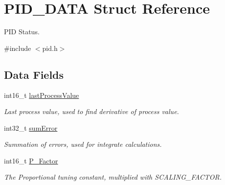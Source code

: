 \hypertarget{struct_p_i_d___d_a_t_a}{}\section{P\+I\+D\+\_\+\+D\+A\+TA Struct Reference}
\label{struct_p_i_d___d_a_t_a}


P\+ID Status.  




{\ttfamily \#include $<$pid.\+h$>$}

\subsection*{Data Fields}
\begin{DoxyCompactItemize}
\item 
\mbox{\label{struct_p_i_d___d_a_t_a_a824a2012e383ca3548dfc0969ce78af0}} 
int16\+\_\+t \hyperlink{struct_p_i_d___d_a_t_a_a824a2012e383ca3548dfc0969ce78af0}{last\+Process\+Value}
\begin{DoxyCompactList}\small\item\em Last process value, used to find derivative of process value. \end{DoxyCompactList}\item 
\mbox{\label{struct_p_i_d___d_a_t_a_abb4705ed19c8668cc3b2a290bcad221d}} 
int32\+\_\+t \hyperlink{struct_p_i_d___d_a_t_a_abb4705ed19c8668cc3b2a290bcad221d}{sum\+Error}
\begin{DoxyCompactList}\small\item\em Summation of errors, used for integrate calculations. \end{DoxyCompactList}\item 
\mbox{\label{struct_p_i_d___d_a_t_a_a30e77a609c5cd17e9d74e1e8315bf883}} 
int16\+\_\+t \hyperlink{struct_p_i_d___d_a_t_a_a30e77a609c5cd17e9d74e1e8315bf883}{P\+\_\+\+Factor}
\begin{DoxyCompactList}\small\item\em The Proportional tuning constant, multiplied with S\+C\+A\+L\+I\+N\+G\+\_\+\+F\+A\+C\+T\+OR. \end{DoxyCompactList}\item 
\mbox{\label{struct_p_i_d___d_a_t_a_a27fadf88e502b77612cf733ca336e1a9}} 

\end{DoxyCompactItemize}
